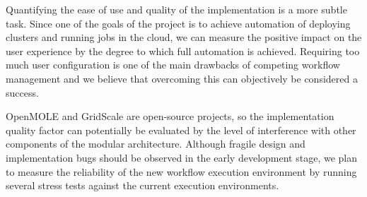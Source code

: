 Quantifying the ease of use and quality of the implementation is a more subtle task. Since one of the goals of the project is to achieve automation of deploying clusters and running jobs in the cloud, we can measure the positive impact on the user experience by the degree to which full automation is achieved. Requiring too much user configuration is one of the main drawbacks of competing workflow management and we believe that overcoming this can objectively be considered a success.

OpenMOLE and GridScale are open-source projects, so the implementation quality factor can potentially be evaluated by the level of interference with other components of the modular architecture. Although fragile design and implementation bugs should be observed in the early development stage, we plan to measure the reliability of the new workflow execution environment by running several stress tests against the current execution environments.